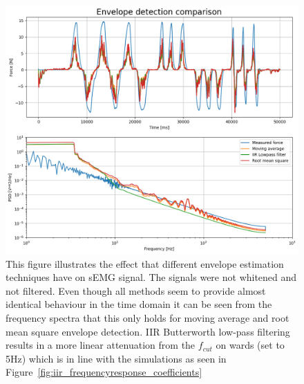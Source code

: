\begin{figure}[h!t]
	\begin{center}
		\includegraphics[width=1.0\columnwidth]{images/measurement_envelopes.png}
	\end{center}
	\caption{This figure illustrates the effect that different envelope estimation techniques have on sEMG signal. The signals were not whitened and not filtered. Even though all methods seem to provide almost identical behaviour in the time domain it can be seen from the frequency spectra that this only holds for moving average and root mean square envelope detection. IIR Butterworth low-pass filtering results in a more linear attenuation from the $f_{cut}$ on wards (set to 5Hz) which is in line with the simulations as seen in Figure~\ref{fig:iir_frequencyresponse_coefficients}}
	\label{fig:result_envelopes}
\end{figure}